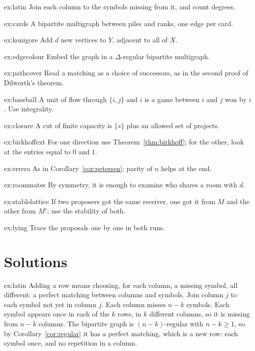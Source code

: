 \begin{hint}{ex:latin}
Join each column to the symbols missing from it, and count degrees.
\end{hint}
\begin{hint}{ex:cards}
A bipartite multigraph between piles and ranks, one edge per card.
\end{hint}
\begin{hint}{ex:konigore}
Add $d$ new vertices to $Y$, adjacent to all of $X$.
\end{hint}
\begin{hint}{ex:edgecolour}
Embed the graph in a $\Delta$-regular bipartite multigraph.
\end{hint}
\begin{hint}{ex:pathcover}
Read a matching as a choice of successors, as in the second proof of Dilworth's theorem.
\end{hint}
\begin{hint}{ex:baseball}
A unit of flow through $\{i,j\}$ and $i$ is a game between $i$ and $j$ won by $i$. Use integrality.
\end{hint}
\begin{hint}{ex:closure}
A cut of finite capacity is $\{s\}$ plus an allowed set of projects.
\end{hint}
\begin{hint}{ex:birkhoffext}
For one direction use Theorem~\ref{thm:birkhoff}; for the other, look at the entries equal to $0$ and $1$.
\end{hint}
\begin{hint}{ex:errera}
As in Corollary~\ref{cor:petersen}; parity of $n$ helps at the end.
\end{hint}
\begin{hint}{ex:roommates}
By symmetry, it is enough to examine who shares a room with $d$.
\end{hint}
\begin{hint}{ex:stablelattice}
If two proposers got the same receiver, one got it from $M$ and the other from $M'$; use the stability of both.
\end{hint}
\begin{hint}{ex:lying}
Trace the proposals one by one in both runs.
\end{hint}

\section{Solutions}

\begin{solution}{ex:latin}
\idea Adding a row means choosing, for each column, a missing symbol, all different: a perfect matching between columns and symbols.
\writeup Join column $j$ to each symbol not yet in column $j$. Each column misses $n-k$ symbols. Each symbol appears once in each of the $k$ rows, in $k$ different
columns, so it is missing from $n-k$ columns. The bipartite graph is $(n-k)$-regular with $n-k\ge1$, so by Corollary~\ref{cor:regular} it has a perfect
matching, which is a new row: each symbol once, and no repetition in a column.
\end{solution}

